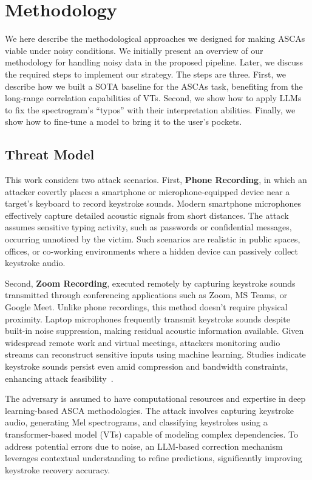 \section{Methodology}
\label{sec:method}

We here describe the methodological approaches we designed for making ASCAs viable under noisy conditions. We initially present an overview of our methodology for handling noisy data in the proposed pipeline. Later, we discuss the required steps to implement our strategy. The steps are three. First, we describe how we built a SOTA baseline for the ASCAs task, benefiting from the long-range correlation capabilities of VTs. Second, we show how to apply LLMs to fix the spectrogram's ``typos'' with their interpretation abilities. Finally, we show how to fine-tune a model to bring it to the user's pockets.

\subsection{Threat Model}

This work considers two attack scenarios. First, \textbf{Phone Recording}, in which an attacker covertly places a smartphone or microphone-equipped device near a target’s keyboard to record keystroke sounds. Modern smartphone microphones effectively capture detailed acoustic signals from short distances. The attack assumes sensitive typing activity, such as passwords or confidential messages, occurring unnoticed by the victim. Such scenarios are realistic in public spaces, offices, or co-working environments where a hidden device can passively collect keystroke audio.

Second, \textbf{Zoom Recording}, executed remotely by capturing keystroke sounds transmitted through conferencing applications such as Zoom, MS Teams, or Google Meet. Unlike phone recordings, this method doesn't require physical proximity. Laptop microphones frequently transmit keystroke sounds despite built-in noise suppression, making residual acoustic information available. Given widespread remote work and virtual meetings, attackers monitoring audio streams can reconstruct sensitive inputs using machine learning. Studies indicate keystroke sounds persist even amid compression and bandwidth constraints, enhancing attack feasibility~\cite{compagno2017don}.

The adversary is assumed to have computational resources and expertise in deep learning-based ASCA methodologies. The attack involves capturing keystroke audio, generating Mel spectrograms, and classifying keystrokes using a transformer-based model (VTs) capable of modeling complex dependencies. To address potential errors due to noise, an LLM-based correction mechanism leverages contextual understanding to refine predictions, significantly improving keystroke recovery accuracy.

